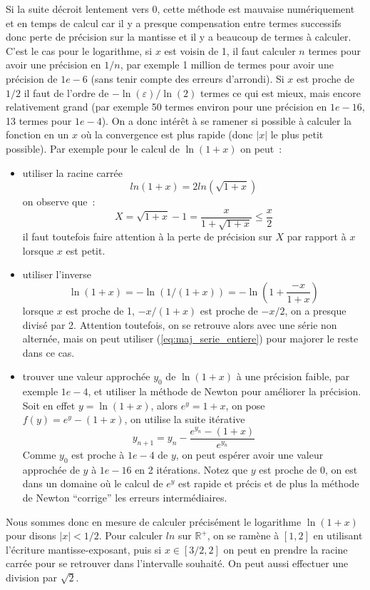 \documentclass[a4paper,11pt]{article}
\newcommand{\R}{{\mathbb{R}}}
\begin{document}
Si la suite d\'ecroit lentement vers 0, cette m\'ethode est
mauvaise num\'eriquement et en temps de calcul
car il y a presque compensation entre
termes successifs donc perte de pr\'ecision sur la mantisse et il
y a beaucoup de termes \`a calculer. C'est le cas pour le logarithme,
si $x$ est voisin de 1, il faut calculer $n$ termes pour avoir une
pr\'ecision en $1/n$, par exemple 1 million de termes pour avoir
une pr\'ecision de $1e-6$ (sans tenir compte des erreurs d'arrondi). 
Si $x$ est proche de $1/2$ il faut de l'ordre
de $-\ln(\varepsilon)/\ln(2)$ termes ce qui est mieux, mais encore
relativement grand (par exemple
50 termes environ pour une pr\'ecision en $1e-16$,
13 termes pour $1e-4$).
On a donc int\'er\^et \`a se
ramener si possible \`a calculer la fonction en un $x$ o\`u la
convergence est plus rapide (donc $|x|$ le plus petit possible).
Par exemple pour le calcul de $\ln(1+x)$ on peut~:
\begin{itemize}
\item utiliser la racine carr\'ee
\[ ln(1+x)= 2 ln(\sqrt{1+x})\]
on observe que~:
\[ X=\sqrt{1+x}-1 = \frac{x}{1+\sqrt{1+x}} \leq \frac{x}{2} \]
il faut toutefois faire attention \`a la perte de pr\'ecision sur
$X$ par rapport \`a $x$ lorsque $x$ est petit.
\item utiliser l'inverse
\[ \ln(1+x)=-\ln(1/(1+x))=-\ln(1 + \frac{-x}{1+x}) \]
lorsque $x$ est proche de 1, $-x/(1+x)$ est proche de $-x/2$, on
a presque divis\'e par 2. Attention toutefois, on se retrouve alors
avec une s\'erie non altern\'ee, mais on peut utiliser 
(\ref{eq:maj_serie_entiere}) pour majorer le reste dans ce cas.
\item trouver une valeur approch\'ee $y_0$ de $\ln(1+x)$ \`a une pr\'ecision
faible, par exemple $1e-4$, et utiliser la m\'ethode de Newton pour
am\'eliorer la pr\'ecision. Soit en effet $y=\ln(1+x)$, alors
$e^y=1+x$, on pose $f(y)=e^y-(1+x)$, on utilise la suite it\'erative
\[ y_{n+1} = y_n - \frac{e^{y_n}-(1+x)}{e^{y_n}}  \]
Comme $y_0$ est proche \`a $1e-4$ de $y$, on peut esp\'erer avoir
une valeur approch\'ee de $y$ \`a $1e-16$ en 2 it\'erations. Notez
que $y$ est proche de $0$, on est dans un domaine o\`u le calcul
de $e^y$ est rapide et pr\'ecis et de plus la m\'ethode de Newton
``corrige'' les erreurs interm\'ediaires.
\end{itemize}

Nous sommes donc en mesure de calculer pr\'ecis\'ement le logarithme
$\ln(1+x)$ pour disons $|x|<1/2$. Pour calculer $ln$ sur $\R^+$,
on se ram\`ene \`a $[1,2]$ en utilisant l'\'ecriture
mantisse-exposant, puis si $x\in[3/2,2]$ on peut en prendre la racine
carr\'ee pour se retrouver dans l'intervalle souhait\'e.
On peut aussi effectuer une division par $\sqrt{2}$.
\end{document}
